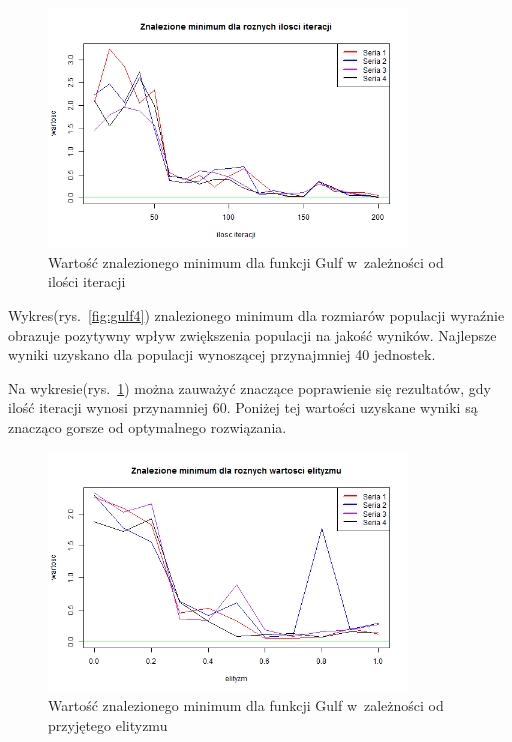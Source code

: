 \documentclass[11pt, a4paper]{article}
\newcommand{\fbi}{\leavevmode{\parindent=1em\indent}}
\begin{document}
\begin{figure}[H]
	\begin{center}
		\includegraphics[width=0.85\textwidth]{./assets/Gulf5.png} 
		\caption{Wartość znalezionego minimum dla funkcji Gulf w~zależności od ilości iteracji}
		\label{fig:gulf5}
	\end{center}
\end{figure}

\fbi
Wykres(rys.~\ref{fig:gulf4}) znalezionego minimum dla rozmiarów populacji wyraźnie obrazuje pozytywny wpływ zwiększenia populacji na jakość wyników. Najlepsze wyniki uzyskano dla populacji wynoszącej przynajmniej 40 jednostek.

\fbi
Na wykresie(rys.~\ref{fig:gulf5}) można zauważyć znaczące poprawienie się rezultatów, gdy ilość iteracji wynosi przynamniej 60. Poniżej tej wartości uzyskane wyniki są znacząco gorsze od optymalnego rozwiązania. 

\begin{figure}[H]
	\begin{center}
		\includegraphics[width=0.85\textwidth]{./assets/Gulf6.png}
		\caption{Wartość znalezionego minimum dla funkcji Gulf w~zależności od przyjętego elityzmu}
		\label{fig:gulf6}
	\end{center}
\end{figure}
\end{document}
